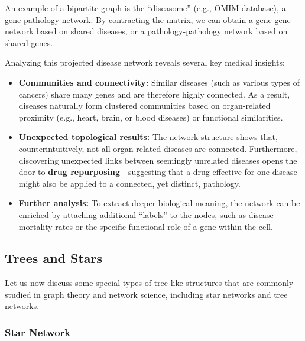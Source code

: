 \begin{example}
    An example of a bipartite graph is the ``diseasome'' (e.g., OMIM database), a gene-pathology network. By contracting the matrix, we can obtain a gene-gene network based on shared diseases, or a pathology-pathology network based on shared genes.

    Analyzing this projected disease network reveals several key medical insights:
    \begin{itemize}
        \item \textbf{Communities and connectivity:} Similar diseases (such as various types of cancers) share many genes and are therefore highly connected. As a result, diseases naturally form clustered communities based on organ-related proximity (e.g., heart, brain, or blood diseases) or functional similarities.
        \item \textbf{Unexpected topological results:} The network structure shows that, counterintuitively, not all organ-related diseases are connected. Furthermore, discovering unexpected links between seemingly unrelated diseases opens the door to \textbf{drug repurposing}—suggesting that a drug effective for one disease might also be applied to a connected, yet distinct, pathology.
        \item \textbf{Further analysis:} To extract deeper biological meaning, the network can be enriched by attaching additional ``labels'' to the nodes, such as disease mortality rates or the specific functional role of a gene within the cell.
    \end{itemize}
\end{example}

\subsection{Trees and Stars}

Let us now discuss some special types of tree-like structures that are commonly studied in graph theory and network science, including star networks and tree networks.

\subsubsection{Star Network}

